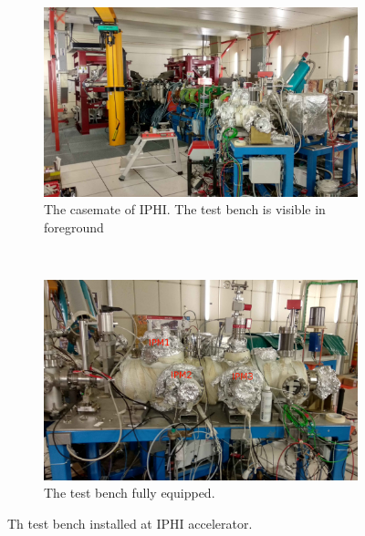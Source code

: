 \begin{figure}[!ht]
	\begin{subfigure}[t]{0.5\textwidth}
		\includegraphics[width=\textwidth]{04_IPHI_Test/figures/fig000_IPHI_tb1.jpg}
		\caption{The casemate of IPHI. The test bench is visible in foreground}
		\label{}
	\end{subfigure}
	~
	\begin{subfigure}[t]{0.5\textwidth}
		\includegraphics[width=\textwidth]{04_IPHI_Test/figures/fig000_IPHI_tb2.jpg}
		\caption{The test bench fully equipped.}
		\label{}
	\end{subfigure}
	\caption[The test bench installed at IPHI accelerator]{Th test bench installed at IPHI accelerator.}
	\label{chap4:IPHI_tb}
\end{figure}
